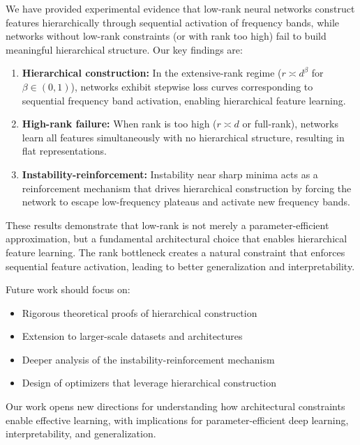 We have provided experimental evidence that low-rank neural networks construct features hierarchically through sequential activation of frequency bands, while networks without low-rank constraints (or with rank too high) fail to build meaningful hierarchical structure. Our key findings are:

\begin{enumerate}
    \item \textbf{Hierarchical construction:} In the extensive-rank regime ($r \asymp d^\beta$ for $\beta \in (0,1)$), networks exhibit stepwise loss curves corresponding to sequential frequency band activation, enabling hierarchical feature learning.
    \item \textbf{High-rank failure:} When rank is too high ($r \asymp d$ or full-rank), networks learn all features simultaneously with no hierarchical structure, resulting in flat representations.
    \item \textbf{Instability-reinforcement:} Instability near sharp minima acts as a reinforcement mechanism that drives hierarchical construction by forcing the network to escape low-frequency plateaus and activate new frequency bands.
\end{enumerate}

These results demonstrate that low-rank is not merely a parameter-efficient approximation, but a fundamental architectural choice that enables hierarchical feature learning. The rank bottleneck creates a natural constraint that enforces sequential feature activation, leading to better generalization and interpretability.

Future work should focus on:
\begin{itemize}
    \item Rigorous theoretical proofs of hierarchical construction
    \item Extension to larger-scale datasets and architectures
    \item Deeper analysis of the instability-reinforcement mechanism
    \item Design of optimizers that leverage hierarchical construction
\end{itemize}

Our work opens new directions for understanding how architectural constraints enable effective learning, with implications for parameter-efficient deep learning, interpretability, and generalization.
